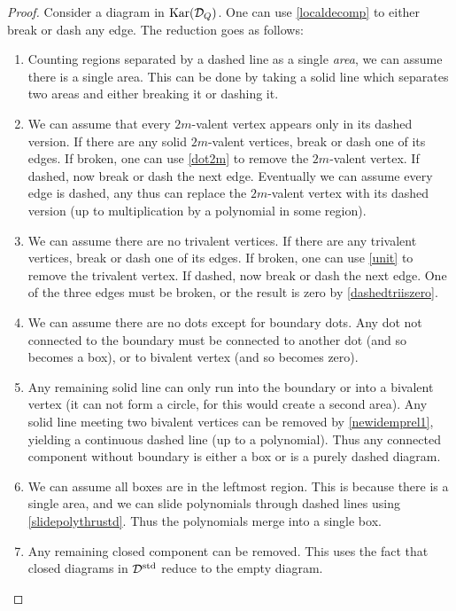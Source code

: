 \begin{proof} Consider a diagram in $\textrm{Kar}({\mathcal{D}}_Q)$. One can use \eqref{localdecomp} to either break or dash any edge. The reduction goes as follows: \begin{enumerate} \item Counting regions
separated by a dashed line as a single \emph{area}, we can assume there is a single area. This can be done by taking a solid line which separates two areas and either breaking it or
dashing it. \item We can assume that every $2m$-valent vertex appears only in its dashed version. If there are any solid $2m$-valent vertices, break or dash one of its edges. If broken,
one can use \eqref{dot2m} to remove the $2m$-valent vertex. If dashed, now break or dash the next edge. Eventually we can assume every edge is dashed, any thus can replace the $2m$-valent
vertex with its dashed version (up to multiplication by a polynomial in some region). \item We can assume there are no trivalent vertices. If there are any trivalent vertices, break or
dash one of its edges. If broken, one can use \eqref{unit} to remove the trivalent vertex. If dashed, now break or dash the next edge. One of the three edges must be broken, or the result
is zero by \eqref{dashedtriiszero}. \item We can assume there are no dots except for boundary dots. Any dot not connected to the boundary must be connected to another dot (and so becomes a
box), or to bivalent vertex (and so becomes zero). \item Any remaining solid line can only run into the boundary or into a bivalent vertex (it can not form a circle, for this would create
a second area). Any solid line meeting two bivalent vertices can be removed by \eqref{newidemprel1}, yielding a continuous dashed line (up to a polynomial). Thus any connected component
without boundary is either a box or is a purely dashed diagram. \item We can assume all boxes are in the leftmost region. This is because there is a single area, and we can slide
polynomials through dashed lines using \eqref{slidepolythrustd}. Thus the polynomials merge into a single box. \item Any remaining closed component can be removed. This uses the fact that
closed diagrams in ${\mathcal{D}}^{\textrm{std}}$ reduce to the empty diagram. \end{enumerate} \end{proof}

